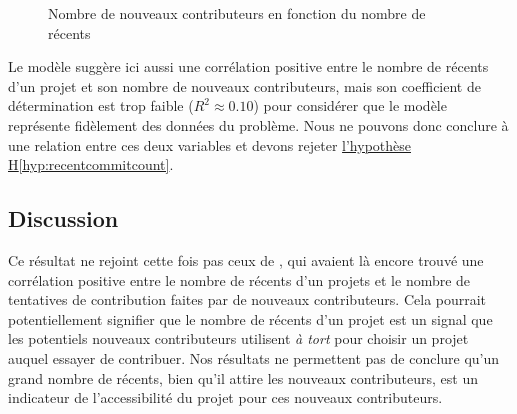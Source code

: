 \begin{figure}[ht]
    

    

    \caption{Nombre de nouveaux contributeurs en fonction du nombre de  récents}
    \label{fig:commitCount}
\end{figure}

Le modèle suggère ici aussi une corrélation positive entre le nombre de  récents d'un projet et
son nombre de nouveaux contributeurs, mais son coefficient de détermination est trop faible ($R^2 \approx
0.10$) pour considérer que le modèle représente fidèlement des données du problème. Nous ne pouvons donc
conclure à une relation entre ces deux variables et devons rejeter
\hyperref[hyp:recentcommitcount]{l'hypothèse H\ref*{hyp:recentcommitcount}}.

\subsection{Discussion}

Ce résultat ne rejoint cette fois pas ceux de \textcite[p.~13,16]{signals-2019}, qui avaient là encore trouvé
une corrélation positive entre le nombre de  récents d'un projets et le nombre de tentatives de
contribution faites par de nouveaux contributeurs. Cela pourrait potentiellement signifier que le nombre de
 récents d'un projet est un signal que les potentiels nouveaux contributeurs utilisent \emph{à
tort} pour choisir un projet auquel essayer de contribuer. Nos résultats ne permettent pas de conclure qu'un
grand nombre de  récents, bien qu'il attire les nouveaux contributeurs, est un indicateur de
l'accessibilité du projet pour ces nouveaux contributeurs.
